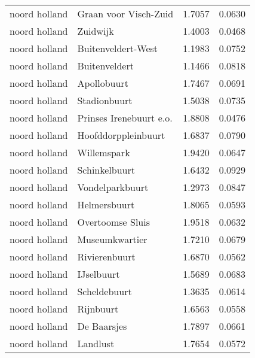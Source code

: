 \begin{longtable}{llcc}
	noord holland & Graan voor Visch-Zuid   & 1.7057  & 0.0630                               \\
	noord holland & Zuidwijk                & 1.4003  & 0.0468                               \\
	noord holland & Buitenveldert-West      & 1.1983  & 0.0752                               \\
	noord holland & Buitenveldert           & 1.1466  & 0.0818                               \\
	noord holland & Apollobuurt             & 1.7467  & 0.0691                               \\
	noord holland & Stadionbuurt            & 1.5038  & 0.0735                               \\
	noord holland & Prinses Irenebuurt e.o. & 1.8808  & 0.0476                               \\
	noord holland & Hoofddorppleinbuurt     & 1.6837  & 0.0790                               \\
	noord holland & Willemspark             & 1.9420  & 0.0647                               \\
	noord holland & Schinkelbuurt           & 1.6432  & 0.0929                               \\
	noord holland & Vondelparkbuurt         & 1.2973  & 0.0847                               \\
	noord holland & Helmersbuurt            & 1.8065  & 0.0593                               \\
	noord holland & Overtoomse Sluis        & 1.9518  & 0.0632                               \\
	noord holland & Museumkwartier          & 1.7210  & 0.0679                               \\
	noord holland & Rivierenbuurt           & 1.6870  & 0.0562                               \\
	noord holland & IJselbuurt              & 1.5689  & 0.0683                               \\
	noord holland & Scheldebuurt            & 1.3635  & 0.0614                               \\
	noord holland & Rijnbuurt               & 1.6563  & 0.0558                               \\
	noord holland & De Baarsjes             & 1.7897  & 0.0661                               \\
	noord holland & Landlust                & 1.7654  & 0.0572                               \\

\end{longtable}
